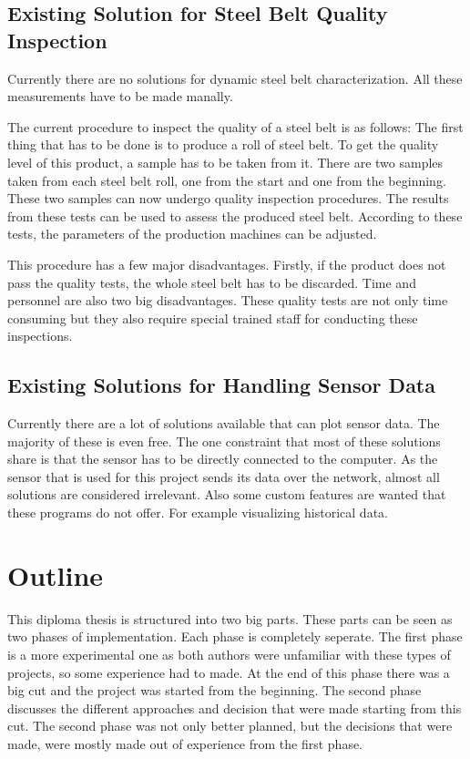 \subsection{Existing Solution for Steel Belt Quality Inspection}

Currently there are no solutions for dynamic steel belt characterization. All these measurements have to be made manally.

The current procedure to inspect the quality of a steel belt is as follows: The first thing that has to be done is to produce a roll of steel belt. To get the quality level of this product, a sample has to be taken from it. There are two samples taken from each steel belt roll, one from the start and one from the beginning. These two samples can now undergo quality inspection procedures. The results from these tests can be used to assess the produced steel belt. According to these tests, the parameters of the production machines can be adjusted.

This procedure has a few major disadvantages. Firstly, if the product does not pass the quality tests, the whole steel belt has to be discarded. Time and personnel are also two big disadvantages. These quality tests are not only time consuming but they also require special trained staff for conducting these inspections.

\subsection{Existing Solutions for Handling Sensor Data}

Currently there are a lot of solutions available that can plot sensor data. The majority of these is even free. The one constraint that most of these solutions share is that the sensor has to be directly connected to the computer. As the sensor that is used for this project sends its data over the network, almost all solutions are considered irrelevant. Also some custom features are wanted that these programs do not offer. For example visualizing historical data.

\section{Outline}


This diploma thesis is structured into two big parts. These parts can be seen as two phases of implementation. Each phase is completely seperate. The first phase is a more experimental one as both authors were unfamiliar with these types of projects, so some experience had to made. At the end of this phase there was a big cut and the project was started from the beginning. The second phase discusses the different approaches and decision that were made starting from this cut. The second phase was not only better planned, but the decisions that were made, were mostly made out of experience from the first phase.

